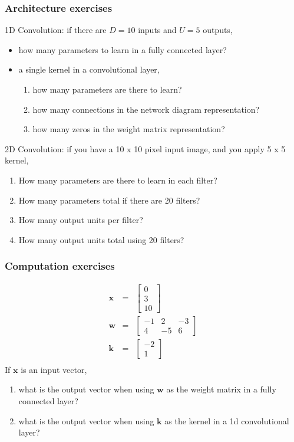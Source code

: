 \documentclass{beamer}
\begin{document}
\begin{frame}
  \frametitle{Architecture exercises}
  1D Convolution: if there are $D=10$ inputs and $U=5$ outputs, 
  \begin{itemize}
  \item how many parameters to learn in a fully
    connected layer?
  \item a single kernel in a convolutional layer,
    \begin{enumerate}
    \item how many parameters are there to learn?
    \item how many connections in the network diagram
      representation?
    \item how many zeros in the weight matrix
      representation?
    \end{enumerate}
  \end{itemize}

  2D Convolution: if you have a 10 x 10 pixel input image, and you
  apply 5 x 5 kernel,
  \begin{enumerate}
  \item How many parameters are there to learn in each filter?
  \item How many parameters total if there are 20 filters?
  \item How many output units per filter?
  \item How many output units total using 20 filters?
  \end{enumerate}
\end{frame}

\begin{frame}
  \frametitle{Computation exercises}
  \begin{eqnarray*}
    \mathbf x &=& \begin{bmatrix}
      0 \\
      3 \\
      10
    \end{bmatrix}\\
    \mathbf w &=& \begin{bmatrix}
      -1 & 2 & -3 \\
      4 & -5 & 6
    \end{bmatrix}\\
    \mathbf k &=& \begin{bmatrix}
      -2 \\
      1
    \end{bmatrix}\\
  \end{eqnarray*}
  If $\mathbf x$ is an input vector,
  \begin{enumerate}
  \item what is the output vector when using $\mathbf w$ as the weight
    matrix in a fully connected layer?
  \item what is the output vector when using $\mathbf k$ as the kernel
    in a 1d convolutional layer?
  \end{enumerate}
\end{frame}
  
\end{document}
